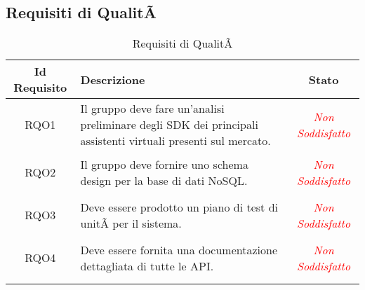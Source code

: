 \subsection{Requisiti di QualitÃ }
\normalsize
\begin{longtable}{|c|>{\centering}m{7cm}|c|}
\hline 
\textbf{Id Requisito} & \textbf{Descrizione} & \textbf{Stato}\\
\hline
\endhead
\hypertarget{RQO1}{RQO1} & Il gruppo deve fare un'analisi preliminare degli SDK dei principali assistenti virtuali presenti sul mercato. & \textcolor{Red}{\textit{Non Soddisfatto}}\\ \hline

\hypertarget{RQO2}{RQO2} & Il gruppo deve fornire uno schema design per la base di dati NoSQL.
 & \textcolor{Red}{\textit{Non Soddisfatto}}\\ \hline

\hypertarget{RQO3}{RQO3} & Deve essere prodotto un piano di test di unitÃ  per il sistema. & \textcolor{Red}{\textit{Non Soddisfatto}}\\ \hline

\hypertarget{RQO4}{RQO4} & Deve essere fornita una documentazione dettagliata di tutte le API. & \textcolor{Red}{\textit{Non Soddisfatto}}\\ \hline

\caption[Requisiti di QualitÃ ]{Requisiti di QualitÃ }
\label{tabella:req2}
\end{longtable}
\clearpage
